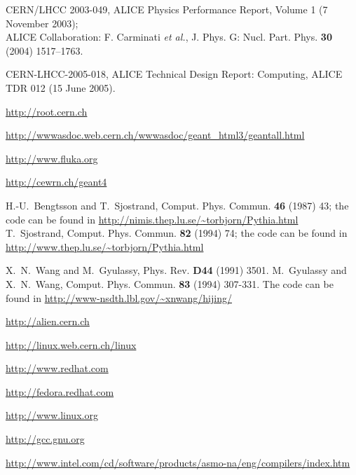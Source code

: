 \documentclass[12pt,a4paper,twoside]{article}
\begin{document}
{%

\begin{thebibliography}{99}

 CERN/LHCC 2003-049, ALICE Physics Performance Report,
  Volume 1 (7 November 2003); \\
  ALICE Collaboration: F. Carminati {\it et al.}, J. Phys. G: Nucl.
  Part. Phys. \textbf{30} (2004) 1517--1763.

 CERN-LHCC-2005-018, ALICE Technical Design Report:
  Computing, ALICE TDR 012 (15 June 2005).

 \url{http://root.cern.ch}

\url{http://wwwasdoc.web.cern.ch/wwwasdoc/geant_html3/geantall.html}

 \url{http://www.fluka.org}

 \url{http://cewrn.ch/geant4}

 H.-U.~Bengtsson and T.~Sjostrand, Comput. Phys.
  Commun. \textbf{46} (1987) 43; \newline the code can be found in
  \url{http://nimis.thep.lu.se/~torbjorn/Pythia.html} \newline
  T.~Sjostrand, Comput. Phys. Commun. \textbf{82} (1994) 74; \newline
  the code can be found in
  \url{http://www.thep.lu.se/~torbjorn/Pythia.html}

 X.~N.~Wang and M.~Gyulassy, Phys. Rev.
  \textbf{D44} (1991) 3501.  \newline M.~Gyulassy and X.~N.~Wang,
  Comput. Phys. Commun. \textbf{83} (1994) 307-331.  \newline The code
  can be found in \url{http://www-nsdth.lbl.gov/~xnwang/hijing/}

  \url{http://alien.cern.ch}

 \url{http://linux.web.cern.ch/linux}

 \url{http://www.redhat.com}

 \url{http://fedora.redhat.com}

 \url{http://www.linux.org}

 \url{http://gcc.gnu.org}

  \url{http://www.intel.com/cd/software/products/asmo-na/eng/compilers/index.htm}


\end{thebibliography}}
\end{document}
